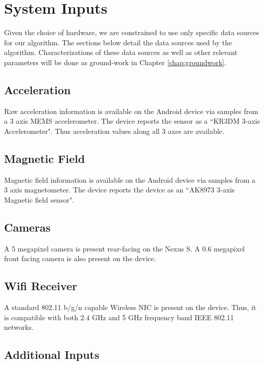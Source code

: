 \section{System Inputs\label{sec:system_inputs}}

Given the choice of hardware, we are constrained to use only specific 
data sources for our algorithm. The sections below detail the data 
sources used by the algorithm. Characterizations of these data sources as well
as other relevant parameters will be done as ground-work in 
Chapter \ref{chap:groundwork}.

\subsection{Acceleration}

Raw acceleration information is available on the Android device via samples 
from a 3 axis MEMS accelerometer. The device reports the sensor as 
a ``KR3DM 3-axis Accelerometer". Thus acceleration values along all 3 axes
are available.

\subsection{Magnetic Field}

Magnetic field information is available on the Android device via samples 
from a 3 axis magnetometer. The device reports the device as an
``AK8973 3-axis Magnetic field sensor".

\subsection{Cameras}

A 5 megapixel camera is present rear-facing on the Nexus S. A 0.6 megapixel
front facing camera is also present on the device.

\subsection{Wifi Receiver}

A standard 802.11 b/g/n capable Wireless NIC is present on the device. Thus,
it is compatible with both 2.4 GHz and 5 GHz frequency band IEEE 802.11 networks.

\subsection{Additional Inputs}

